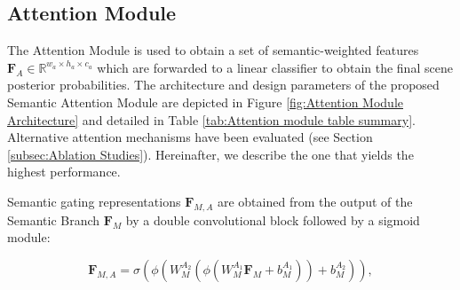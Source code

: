 \documentclass[review, 3p, sort&compress]{elsarticle}
\begin{document}
\subsection{Attention Module}
\label{subsec:Attention module}
The Attention Module is used to obtain a set of semantic-weighted features \(\textbf{F}_{A} \in \mathbb{R}^{w_a \times h_a \times c_a}\) which are forwarded to a linear classifier to obtain the final scene posterior probabilities. The architecture and design parameters of the proposed Semantic Attention Module are depicted in Figure \ref{fig:Attention Module Architecture} and detailed in Table \ref{tab:Attention module table summary}. Alternative attention mechanisms have been evaluated (see Section \ref{subsec:Ablation Studies}). Hereinafter, we describe the one that yields the highest performance.

\begin{table}
\end{table}


Semantic gating representations \(\textbf{F}_{M,A}\) are obtained from the output of the Semantic Branch \(\textbf{F}_M\) by a double convolutional block followed by a sigmoid module:

\begin{equation}
    \textbf{F}_{M,A} = \sigma \left( \phi \left( W^{A_2}_M  \left( \phi \left(  W^{A_1}_M \textbf{F}_M + b^{A_1}_M \right)   \right)  + b^{A_2}_M \right)   \right),
\end{equation}
\end{document}
